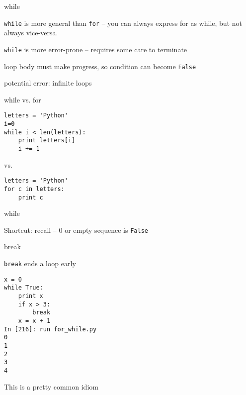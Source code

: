 \documentclass{beamer}
\begin{document}
\begin{frame}[fragile]{while}

{\Large \verb|while| is more general than \verb|for| -- 
you can always express for as while,
but not always vice-versa.}

\vfill

{\Large \verb|while| is more error-prone -- requires some care to terminate}

\vfill
{\Large  loop body must make progress, so condition can become \verb|False| }

\vfill
{\Large  potential error: infinite loops }
\end{frame}



\begin{frame}[fragile]{while vs. for}

\begin{verbatim}
letters = 'Python'
i=0
while i < len(letters):
    print letters[i]
    i += 1
\end{verbatim}
vs.
\begin{verbatim}
letters = 'Python'
for c in letters:
    print c
\end{verbatim}

\end{frame}


\begin{frame}[fragile]{while}

{\Large Shortcut: recall -- 0 or empty sequence is \verb|False| }


\end{frame}


\begin{frame}[fragile]{break}

{\Large \verb|break| ends a loop early}

\begin{verbatim}
x = 0
while True:
    print x
    if x > 3:
        break
    x = x + 1
In [216]: run for_while.py
0
1
2
3
4
\end{verbatim}

This is a pretty common idiom

\end{frame}
\end{document}
